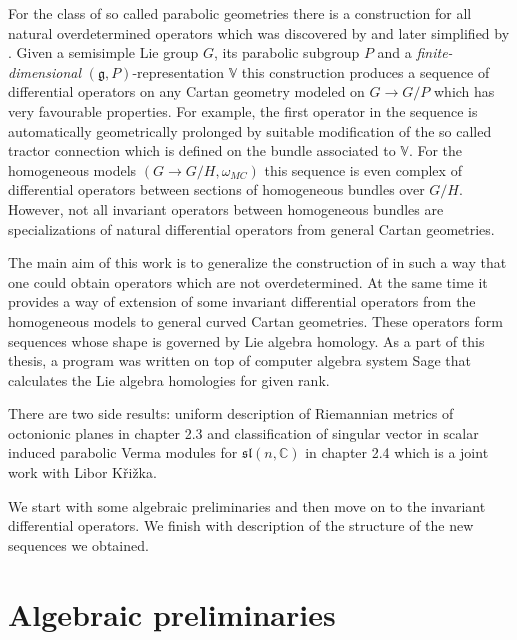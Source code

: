 \documentclass[12pt,a4paper,final]{report}
\begin{document}
For the class of so called parabolic geometries there is a construction for all natural overdetermined operators which was discovered by \cite{cap_bernstein-gelfand-gelfand_2001} and later simplified by \cite{calderbank_differential_2001}. Given a semisimple Lie group $G$, its parabolic subgroup $P$ and a \emph{finite-dimensional} $(\mathfrak{g}, P)$-representation $\mathbb{V}$ this construction produces a sequence of differential operators on any Cartan geometry modeled on $G \to G/P$ which has very favourable properties. For example, the first operator in the sequence is automatically geometrically prolonged by suitable modification of the so called tractor connection which is defined on the bundle associated to $\mathbb{V}.$ For the homogeneous models $(G \to G/H, \omega_{{MC}})$ this sequence is even complex of differential operators between sections of homogeneous bundles over $G/H.$ However, not all invariant operators between homogeneous bundles are specializations of natural differential operators from general Cartan geometries.

The main aim of this work is to generalize the construction of \cite{calderbank_differential_2001} in such a way that one could obtain operators which are not overdetermined. At the same time it provides a way of extension of some invariant differential operators from the homogeneous models to general curved Cartan geometries. These operators form sequences whose shape is governed by Lie algebra homology. As a part of this thesis, a  program was written on top of computer algebra system Sage that calculates the Lie algebra homologies for given rank.

 There are two side results: uniform description of Riemannian metrics of octonionic planes in chapter 2.3 and classification of singular vector in scalar induced parabolic Verma modules for $\mathfrak{sl}(n, \mathbb{C})$ in chapter 2.4 which is a joint work with Libor Křižka.

We start with some algebraic preliminaries and then move on to the invariant differential operators. We finish with description of the structure of the new sequences we obtained.

\chapter{Algebraic preliminaries}
\end{document}
